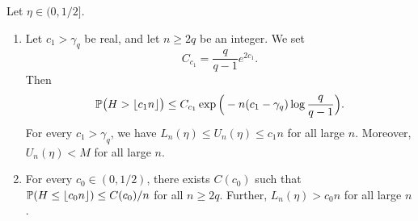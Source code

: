 \begin{lemma}\label{lem:pre-centre}
Let $\eta \in (0, 1/2]$.
\begin{enumerate}[label=(\alph*)]
\item Let $c_1 > \gamma_q$ be real, and let $n \ge 2q$ be an integer. We set
\[
C_{c_1} = \frac{q}{q - 1} e^{2c_1}.
\]
Then
\begin{equation}\label{eq:pre-first-moment}
\mathbb P\big(H > \lfloor c_1 n \rfloor\big) \le C_{c_1} \exp\Big(-n (c_1 - \gamma_q) \log \frac{q}{q - 1}\Big).
\end{equation}
For every $c_1 > \gamma_q$, we have $L_n(\eta) \le U_n(\eta) \le c_1 n$ for all large $n$. Moreover, $U_n(\eta) < M$ for all large $n$.
\item For every $c_0 \in (0, 1/2)$, there exists $C(c_0)$ such that $\mathbb P(H \le \lfloor c_0 n \rfloor) \le C(c_0)/n$ for all $n \ge 2q$. Further, $L_n(\eta) > c_0 n$ for all large $n$.
\end{enumerate}
\end{lemma}

